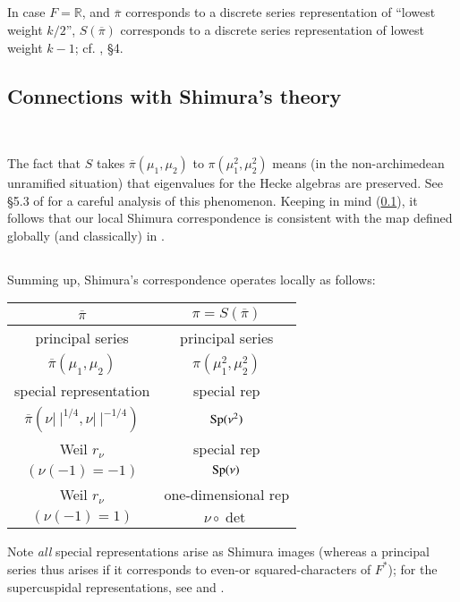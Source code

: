 \subsection{}\label{art1-sec7.4}
In case $F=\mathbb{R}$, and $\overline{\pi}$ corresponds to a discrete series representation of ``lowest weight $k/2$'', $S(\overline{\pi})$ corresponds to a discrete series representation of lowest weight $k-1$; cf. \cite{Ge}, \S4.

\subsection{Connections with Shimura's theory}\label{art1-sec7.5}
~

The fact that $S$ takes $\overline{\pi}(\mu_{1},\mu_{2})$ to $\pi(\mu^{2}_{1},\mu^{2}_{2})$ means (in the non-archimedean unramified situation) that eigenvalues for the Hecke algebras are preserved. See \S5.3 of \cite{Ge} for a careful analysis of this phenomenon. Keeping in mind (\ref{art1-sec7.4}), it follows that our local Shimura correspondence is consistent with the map defined globally (and classically) in \cite{Shim}.

\subsection{}\label{art1-sec7.6}\pageoriginale
Summing up, Shimura's correspondence operates locally as follows:
\begin{center}
\tabcolsep=10pt
\renewcommand{\arraystretch}{1.1}
\begin{tabular}{c|c}
$\overline{\pi}$ & $\pi=S(\overline{\pi})$\\
\hline
principal series & principal series\\
$\overline{\pi}(\mu_{1},\mu_{2})$ & $\pi(\mu^{2}_{1},\mu^{2}_{2})$\\
\hline
special representation & special rep\\
$\overline{\pi}(\nu|~|^{1/4},\nu|~|^{-1/4})$ & $\operatorname{Sp}(\nu^{2})$\\
\hline
Weil $r_{\nu}$ & special rep\\
$(\nu(-1)=-1)$ & $\operatorname{Sp}(\nu)$\\
\hline
Weil $r_{\nu}$ & one-dimensional rep\\
$(\nu(-1)=1)$ & $\nu\circ \det$
\end{tabular}
\end{center}
Note {\em all} special representations arise as Shimura images (whereas a principal series thus arises if it corresponds to even-or squared-characters of $F^{*}$); for the supercuspidal representations, see \cite{Flicker} and \cite{Meister}.

